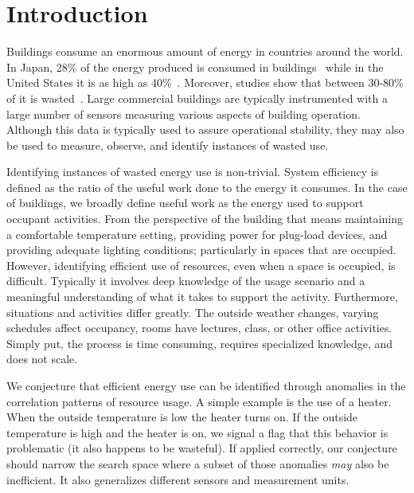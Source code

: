 \section{Introduction}
Buildings consume an enormous amount of energy in countries around the world.  In 
Japan, 28\% of the energy produced is consumed in buildings~\cite{japanbuildings} while in the United 
States it is as high as 40\%~\cite{epabuildings}.  Moreover, studies show that between 30-80\% of it
is wasted~\cite{waste_science, next10_waste}.  Large commercial buildings are typically instrumented
with a large number of sensors measuring various aspects of building operation.  Although this data is
typically used to assure operational stability, they may also be used to measure, observe, and identify
instances of wasted use.

Identifying instances of wasted energy use is non-trivial.  System efficiency is defined as the ratio of the 
useful work done to the energy it consumes.  In the case of buildings, we broadly define useful work as 
the energy used to support occupant activities.  From the perspective of the building that means maintaining
a comfortable temperature setting, providing power for plug-load devices, and providing adequate lighting
conditions; particularly in spaces that are occupied.  However, identifying efficient use of resources,
even when a space is occupied, is difficult.  Typically it involves deep knowledge of the usage scenario and
a meaningful understanding of what it takes to support the activity.  Furthermore, situations and activities differ
greatly.  The outside weather changes, varying schedules affect occupancy, rooms have lectures, class,
or other office activities.  Simply put, the process is time consuming, requires specialized knowledge,
and does not scale.

We conjecture that efficient energy use can be identified through anomalies in the correlation
patterns of resource usage.  A simple example is the use of a heater.  When the outside temperature is low
the heater turns on.  If the outside temperature is high and the heater is on, we signal a flag that this
behavior is problematic (it also happens to be wasteful).  If applied correctly, our conjecture should narrow
the search space where a subset of those anomalies \emph{may} also be inefficient.
It also generalizes different sensors and measurement units.  

